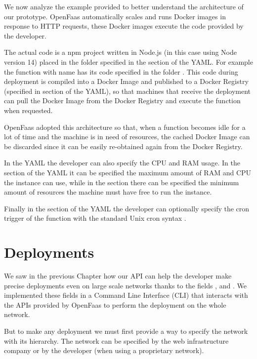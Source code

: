 We now analyze the example provided to better understand the architecture of our prototype. OpenFaas automatically scales and runs Docker images in response to HTTP requests, these Docker images execute the code provided by the developer.

The actual code is a npm project written in Node.js (in this case using Node version 14) placed in the folder specified in the  section of the YAML. For example the function with name  has its code specified in the folder .
This code during deployment is compiled into a Docker Image and published to a Docker Registry (specified in  section of the YAML), so that machines that receive the deployment can pull the Docker Image from the Docker Registry and execute the function when requested.

OpenFaas adopted this architecture so that, when a function becomes idle for a lot of time and the machine is in need of resources, the cached Docker Image can be discarded since it can be easily re-obtained again from the Docker Registry.

In the YAML the developer can also specify the CPU and RAM usage. In the  section of the YAML it can be specified the maximum amount of RAM and CPU the instance can use, while in the  section there can be specified the minimum amount of resources the machine must have free to run the instance.

Finally in the  section of the YAML the developer can optionally specify the cron trigger of the function with the standard Unix cron syntax \cite{cron-syntax}.


\section{Deployments}
We saw in the previous Chapter how our API can help the developer make precise deployments even on large scale networks thanks to the fields ,  and . We implemented these fields in a Command Line Interface (CLI) that interacts with the APIs provided by OpenFaas to perform the deployment on the whole network.

But to make any deployment we must first provide a way to specify the network with its hierarchy. The network can be specified by the web infrastructure company or by the developer (when using a proprietary network).


